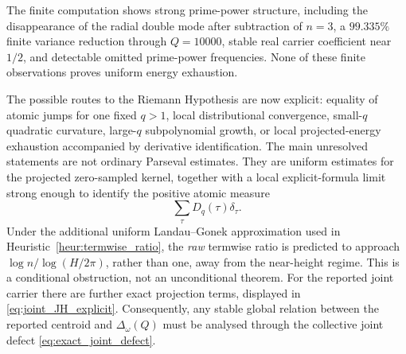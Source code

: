 \documentclass[11pt]{amsart}
\numberwithin{equation}{section}
\theoremstyle{plain}
\theoremstyle{definition}
\theoremstyle{remark}
\newcommand{\1}{\mathbf{1}}
\begin{document}
The finite computation shows strong prime-power structure,
including the disappearance of the radial double mode after subtraction of
\(n=3\), a \(99.335\%\) finite variance reduction through \(Q=10000\),
stable real carrier coefficient near \(1/2\), and detectable omitted
prime-power frequencies.  None of these finite observations proves
uniform energy exhaustion.

The possible routes to the Riemann Hypothesis are now explicit: equality of
atomic jumps for one fixed \(q>1\), local distributional convergence,
small-\(q\) quadratic curvature, large-\(q\) subpolynomial growth, or local
projected-energy exhaustion accompanied by derivative identification.  The
main unresolved statements are not ordinary Parseval estimates.  They are
uniform estimates for the projected zero-sampled kernel, together with a
local explicit-formula limit strong enough to identify the positive atomic
measure
\begin{equation}
\sum_\tau D_q(\tau)\delta_\tau.
\label{eq:conclusion_positive_measure}
\end{equation}
Under the additional uniform Landau--Gonek approximation used in
Heuristic~\ref{heur:termwise_ratio}, the \emph{raw} termwise ratio is
predicted to approach \(\log n/\log(H/2\pi)\), rather than one, away from
the near-height regime.  This is a conditional obstruction, not an
unconditional theorem.  For the reported joint carrier there are further
exact projection terms, displayed in \eqref{eq:joint_JH_explicit}.
Consequently, any stable global relation between the reported centroid and
\(\Delta_\omega(Q)\) must be analysed through the collective joint defect
\eqref{eq:exact_joint_defect}.
\end{document}
